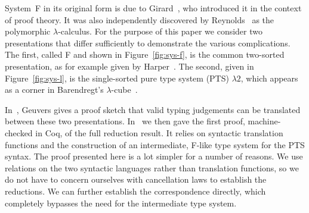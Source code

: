 \documentclass[a4paper,UKenglish]{lipics-v2016}
\newcommand{\SysL}{$\lambda2$\xspace}
\theoremstyle{plain}
\begin{document}
System~F in its original form is due to Girard~\cite{Girard1972, Girard1989}, who introduced it in the context of proof theory.
It was also independently discovered by Reynolds~\cite{DBLP:conf/programm/Reynolds74} as the polymorphic $\lambda$-calculus.
For the purpose of this paper we consider two presentations that differ sufficiently to demonstrate the various complications.
The first, called F and shown in Figure~\ref{fig:sys-f}, is the common two-sorted presentation, as for example given by Harper~\cite{Harper2013}.
The second, given in Figure~\ref{fig:sys-l}, is the single-sorted pure type system (PTS) \SysL, which appears as a corner in Barendregt's $\lambda$-cube~\cite{DBLP:journals/jfp/Barendregt91}.

In~\cite{Geuvers1993}, Geuvers gives a proof sketch that valid typing judgements can be translated between these two presentations.
In~\cite{KaiserEtAl:2017:sysf_pts_equiv_coq} we then gave the first proof, machine-checked in Coq, of the full reduction result.
It relies on syntactic translation functions and the construction of an intermediate, F-like type system for the PTS syntax.
The proof presented here is a lot simpler for a number of reasons.
We use relations on the two syntactic languages rather than translation functions, so we do not have to concern ourselves with cancellation laws to establish the reductions.
We can further establish the correspondence directly, which completely bypasses the need for the intermediate type system.
\end{document}
